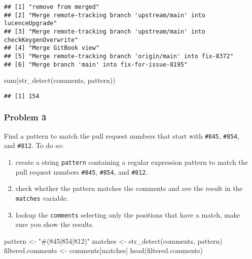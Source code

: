 \documentclass[
]{article}
\newenvironment{Shaded}{\begin{snugshade}}{\end{snugshade}}
\newcommand{\FunctionTok}[1]{\textcolor[rgb]{0.00,0.00,0.00}{#1}}
\newcommand{\NormalTok}[1]{#1}
\newcommand{\OtherTok}[1]{\textcolor[rgb]{0.56,0.35,0.01}{#1}}
\newcommand{\StringTok}[1]{\textcolor[rgb]{0.31,0.60,0.02}{#1}}
\providecommand{\tightlist}{%
  \setlength{\itemsep}{0pt}\setlength{\parskip}{0pt}}
\begin{document}
\begin{verbatim}
## [1] "remove from merged"                                                    
## [2] "Merge remote-tracking branch 'upstream/main' into lucenceUpgrade"      
## [3] "Merge remote-tracking branch 'upstream/main' into checkKeygenOverwrite"
## [4] "Merge GitBook view"                                                    
## [5] "Merge remote-tracking branch 'origin/main' into fix-8372"              
## [6] "Merge branch 'main' into fix-for-issue-8195"
\end{verbatim}

\begin{Shaded}
\begin{Highlighting}[]
\FunctionTok{sum}\NormalTok{(}\FunctionTok{str\_detect}\NormalTok{(comments, pattern))}
\end{Highlighting}
\end{Shaded}

\begin{verbatim}
## [1] 154
\end{verbatim}

\hypertarget{problem-3}{%
\subsubsection{Problem 3}\label{problem-3}}

Find a pattern to match the pull request numbers that start with
\texttt{\#845}, \texttt{\#854}, and \texttt{\#812}. To do so:

\begin{enumerate}
\def\labelenumi{\arabic{enumi}.}
\tightlist
\item
  create a string \texttt{pattern} containing a regular expression
  pattern to match the pull request numbers \texttt{\#845},
  \texttt{\#854}, and \texttt{\#812}.
\item
  check whether the pattern matches the comments and ave the result in
  the \texttt{matches} variable.
\item
  lookup the \texttt{comments} selecting only the positions that have a
  match, make sure you show the results.
\end{enumerate}

\begin{Shaded}
\begin{Highlighting}[]
\NormalTok{pattern }\OtherTok{\textless{}{-}} \StringTok{"\#(845|854|812)"}
\NormalTok{matches }\OtherTok{\textless{}{-}} \FunctionTok{str\_detect}\NormalTok{(comments, pattern)}
\NormalTok{filtered.comments }\OtherTok{\textless{}{-}}\NormalTok{ comments[matches]}
\FunctionTok{head}\NormalTok{(filtered.comments)}
\end{Highlighting}
\end{Shaded}
\end{document}
